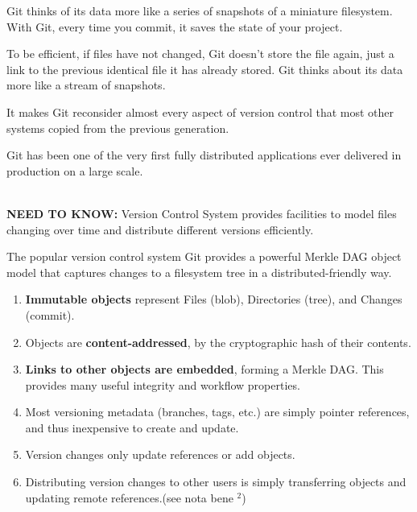 \documentclass{tufte-handout}
\begin{document}
	Git thinks of its data more like a series of snapshots of a miniature filesystem. With Git, every time you commit, it saves the state of your project.
	
	To be efficient, if files have not changed, Git doesn't store the file again, just a link to the previous identical file it has already stored. Git thinks about its data more like a stream of snapshots.
	
	It makes Git reconsider almost every aspect of version control that most other systems copied from the previous generation.
	
	Git has been one of the very first fully distributed applications ever delivered in production on a large scale.
	
	
	\noindent\hrulefill
	\vspace{3pt} \\	
	
	\textbf{NEED TO KNOW:} Version Control System provides facilities to model files changing over time and distribute different versions efficiently.
	
	The popular version control system Git provides a powerful Merkle DAG object model that captures changes to a filesystem tree in a distributed-friendly way.

	
	\begin{enumerate}
		\item \textbf{Immutable objects} represent Files (blob), Directories (tree), and Changes (commit).
		\item Objects are \textbf{content-addressed}, by the cryptographic hash of their contents.
		\item \textbf{Links to other objects are embedded}, forming a Merkle DAG. This provides many useful integrity and workflow properties.
		\item Most versioning metadata (branches, tags, etc.) are simply pointer references, and thus inexpensive to create and update.
		\item Version changes only update references or add objects.
		\item Distributing version changes to other users is simply transferring objects and updating remote references.(see nota bene ${}^{2}$)
	\end{enumerate}
	
	\vspace{3pt}
	\noindent\hrulefill
\end{document}
